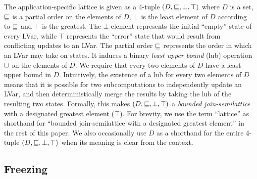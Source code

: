 The application-specific lattice is given as a 4-tuple $(D, \sqsubseteq, \bot, \top)$ where
$D$ is a set, $\sqsubseteq$ is a partial order on the elements of $D$, $\bot$ is
the least element of $D$ according to $\sqsubseteq$ and $\top$ is the greatest.
The $\bot$ element represents the initial ``empty'' state of every LVar,
while $\top$ represents the ``error'' state that would result from conflicting
updates to an LVar.  The partial order $\sqsubseteq$ represents the order in which
an LVar may take on states.  It induces a binary \emph{least upper bound} (lub)
operation $ \sqcup $ on the elements of $D$.
We require that every two elements of $D$ have a least upper bound in $D$.
Intuitively, the existence of a lub for every two elements of $D$ means that it
is possible for two subcomputations to independently update an LVar, and then
deterministically merge the results by taking the lub of the resulting two
states.  Formally, this makes $(D, \sqsubseteq, \bot, \top)$ a \emph{bounded
  join-semilattice} with a designated greatest element ($\top$).
For brevity, we use the term
``lattice'' as shorthand for ``bounded join-semilattice with a
designated greatest element'' in the rest of this paper.
We also occasionally use $D$ as a shorthand for the entire 4-tuple
$(D, \sqsubseteq, \bot, \top)$ when its meaning is clear from the
context.

\subsection{Freezing}




